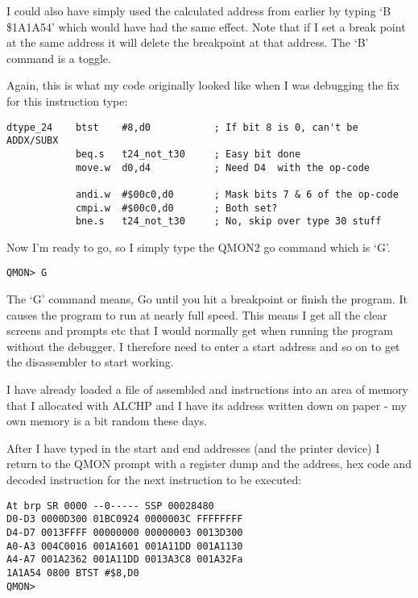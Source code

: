 \begin{appendix}
I could also have simply used the calculated address from earlier by typing `B
\$1A1A54' which would have had the same effect. Note that if I set a break point
at the same address it will delete the breakpoint at that address. The `B'
command is a toggle.

Again, this is what my code originally looked like when I was debugging the fix
for this instruction type:

\begin{lstlisting}[firstnumber=1,caption={QLTDis Broken Code}]
dtype_24    btst    #8,d0           ; If bit 8 is 0, can't be ADDX/SUBX
            beq.s   t24_not_t30     ; Easy bit done
            move.w  d0,d4           ; Need D4  with the op-code

            andi.w  #$00c0,d0       ; Mask bits 7 & 6 of the op-code
            cmpi.w  #$00c0,d0       ; Both set?
            bne.s   t24_not_t30     ; No, skip over type 30 stuff
\end{lstlisting}

Now I'm ready to go, so I simply type the QMON2 go command which is `G'.

\begin{lstlisting}[frame=none,numbers=none,]
QMON> G
\end{lstlisting}

The `G' command means, Go until you hit a breakpoint or finish the program. It
causes the program to run at nearly full speed. This means I get all the clear
screens and prompts etc that I would normally get when running the program
without the debugger. I therefore need to enter a start address and so on to get
the disassembler to start working.

I have already loaded a file of assembled  and  instructions into an
area of memory that I allocated with ALCHP and I have its address written down
on paper -{} my own memory is a bit random these days.

After I have typed in the start and end addresses (and the printer device) I
return to the QMON prompt with a register dump and the address, hex code and
decoded instruction for the next instruction to be executed:

\begin{lstlisting}[frame=none,numbers=none,]
At brp SR 0000 --0----- SSP 00028480
D0-D3 0000D300 01BC0924 0000003C FFFFFFFF
D4-D7 0013FFFF 00000000 00000003 0013D300
A0-A3 004C0016 001A1601 001A11DD 001A1130
A4-A7 001A2362 001A11DD 0013A3C8 001A32Fa
1A1A54 0800 BTST #$8,D0
QMON>
\end{lstlisting}


\end{appendix}

